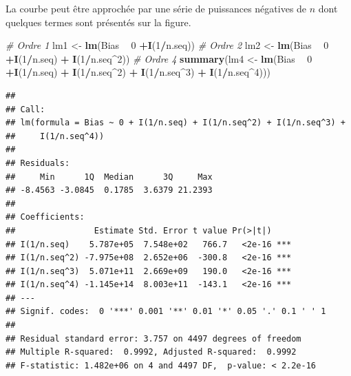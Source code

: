 \documentclass[
  11pt,
  french,
  a4paper,
  extrafontsizes,onecolumn,openright
  ]{memoir}
\newenvironment{Shaded}{\begin{snugshade}}{\end{snugshade}}
\newcommand{\CommentTok}[1]{\textcolor[rgb]{0.56,0.35,0.01}{\textit{#1}}}
\newcommand{\DecValTok}[1]{\textcolor[rgb]{0.00,0.00,0.81}{#1}}
\newcommand{\KeywordTok}[1]{\textcolor[rgb]{0.13,0.29,0.53}{\textbf{#1}}}
\newcommand{\NormalTok}[1]{#1}
\newcommand{\OperatorTok}[1]{\textcolor[rgb]{0.81,0.36,0.00}{\textbf{#1}}}
\newcommand{\StringTok}[1]{\textcolor[rgb]{0.31,0.60,0.02}{#1}}
\begin{document}
\normalsize

La courbe peut être approchée par une série de puissances négatives de \(n\) dont quelques termes sont présentés sur la figure.

\scriptsize

\begin{Shaded}
\begin{Highlighting}[]
\CommentTok{# Ordre 1}
\NormalTok{lm1 <-}\StringTok{ }\KeywordTok{lm}\NormalTok{(Bias }\OperatorTok{~}\StringTok{ }\DecValTok{0} \OperatorTok{+}\KeywordTok{I}\NormalTok{(}\DecValTok{1}\OperatorTok{/}\NormalTok{n.seq))}
\CommentTok{# Ordre 2}
\NormalTok{lm2 <-}\StringTok{ }\KeywordTok{lm}\NormalTok{(Bias }\OperatorTok{~}\StringTok{ }\DecValTok{0} \OperatorTok{+}\KeywordTok{I}\NormalTok{(}\DecValTok{1}\OperatorTok{/}\NormalTok{n.seq) }\OperatorTok{+}\StringTok{ }\KeywordTok{I}\NormalTok{(}\DecValTok{1}\OperatorTok{/}\NormalTok{n.seq}\OperatorTok{^}\DecValTok{2}\NormalTok{))}
\CommentTok{# Ordre 4}
\KeywordTok{summary}\NormalTok{(lm4 <-}\StringTok{ }\KeywordTok{lm}\NormalTok{(Bias }\OperatorTok{~}\StringTok{ }\DecValTok{0} \OperatorTok{+}\KeywordTok{I}\NormalTok{(}\DecValTok{1}\OperatorTok{/}\NormalTok{n.seq) }\OperatorTok{+}\StringTok{ }\KeywordTok{I}\NormalTok{(}\DecValTok{1}\OperatorTok{/}\NormalTok{n.seq}\OperatorTok{^}\DecValTok{2}\NormalTok{) }
                  \OperatorTok{+}\StringTok{ }\KeywordTok{I}\NormalTok{(}\DecValTok{1}\OperatorTok{/}\NormalTok{n.seq}\OperatorTok{^}\DecValTok{3}\NormalTok{) }\OperatorTok{+}\StringTok{ }\KeywordTok{I}\NormalTok{(}\DecValTok{1}\OperatorTok{/}\NormalTok{n.seq}\OperatorTok{^}\DecValTok{4}\NormalTok{)))}
\end{Highlighting}
\end{Shaded}

\begin{verbatim}
## 
## Call:
## lm(formula = Bias ~ 0 + I(1/n.seq) + I(1/n.seq^2) + I(1/n.seq^3) + 
##     I(1/n.seq^4))
## 
## Residuals:
##     Min      1Q  Median      3Q     Max 
## -8.4563 -3.0845  0.1785  3.6379 21.2393 
## 
## Coefficients:
##                Estimate Std. Error t value Pr(>|t|)    
## I(1/n.seq)    5.787e+05  7.548e+02   766.7   <2e-16 ***
## I(1/n.seq^2) -7.975e+08  2.652e+06  -300.8   <2e-16 ***
## I(1/n.seq^3)  5.071e+11  2.669e+09   190.0   <2e-16 ***
## I(1/n.seq^4) -1.145e+14  8.003e+11  -143.1   <2e-16 ***
## ---
## Signif. codes:  0 '***' 0.001 '**' 0.01 '*' 0.05 '.' 0.1 ' ' 1
## 
## Residual standard error: 3.757 on 4497 degrees of freedom
## Multiple R-squared:  0.9992, Adjusted R-squared:  0.9992 
## F-statistic: 1.482e+06 on 4 and 4497 DF,  p-value: < 2.2e-16
\end{verbatim}
\end{document}
